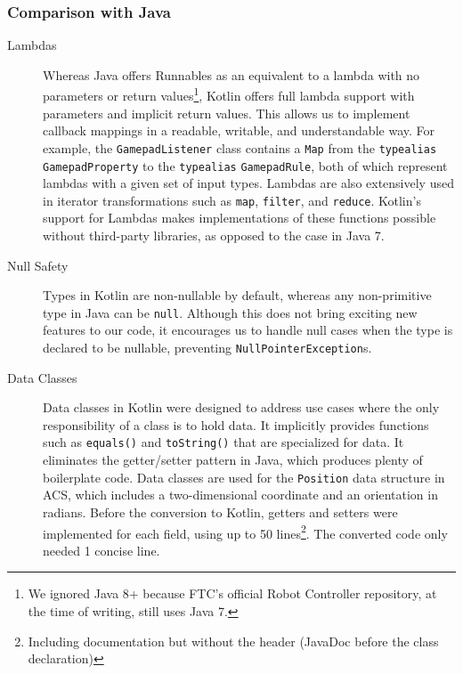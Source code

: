 \documentclass{article}
\begin{document}
\subsubsection{Comparison with Java}
\begin{description}

\item[Lambdas]
Whereas Java offers Runnables as an equivalent to a lambda with no parameters or return values\footnote{We ignored Java 8+ because FTC's official Robot Controller repository, at the time of writing, still uses Java 7.}, Kotlin offers full lambda support with parameters and implicit return values. This allows us to implement callback mappings in a readable, writable, and understandable way. For example, the \texttt{GamepadListener} class contains a \texttt{Map} from the \texttt{typealias} \texttt{GamepadProperty} to the \texttt{typealias} \texttt{GamepadRule}, both of which represent lambdas with a given set of input types. Lambdas are also extensively used in iterator transformations such as \texttt{map}, \texttt{filter}, and \texttt{reduce}. Kotlin's support for Lambdas makes implementations of these functions possible without third-party libraries, as opposed to the case in Java 7.

\item[Null Safety]
Types in Kotlin are non-nullable by default, whereas any non-primitive type in Java can be \texttt{null}. Although this does not bring exciting new features to our code, it encourages us to handle null cases when the type is declared to be nullable, preventing \texttt{NullPointerException}s.

\item[Data Classes]
Data classes in Kotlin were designed to address use cases where the only responsibility of a class is to hold data. It implicitly provides functions such as \texttt{equals()} and \texttt{toString()} that are specialized for data. It eliminates the getter/setter pattern in Java, which produces plenty of boilerplate code. Data classes are used for the \texttt{Position} data structure in ACS, which includes a two-dimensional coordinate and an orientation in radians. Before the conversion to Kotlin, getters and setters were implemented for each field, using up to 50 lines\footnote{Including documentation but without the header (JavaDoc before the class declaration)}. The converted code only needed 1 concise line.

\end{description}
\end{document}
